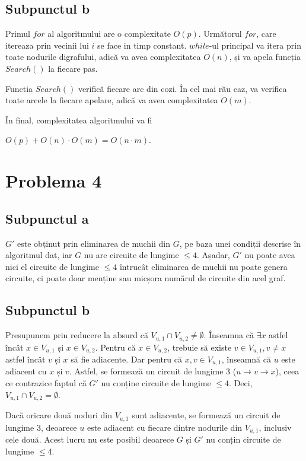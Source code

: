 \documentclass{article}
\begin{document}
\subsection*{\fontsize{16}{30}\selectfont Subpunctul b}
{\fontsize{14}{16}\selectfont
Primul $for$ al algoritmului are o complexitate $O(p)$. Următorul $for$, care itereaza prin vecinii lui $i$ se face in timp constant. $while$-ul principal va itera prin toate nodurile digrafului, adică va avea complexitatea $O(n)$, și va apela funcția $Search()$ la fiecare pas.

Functia $Search()$ verifică fiecare arc din cozi. În cel mai rău caz, va verifica toate arcele la fiecare apelare, adică va avea complexitatea $O(m)$.

În final, complexitatea algoritmului va fi \\
\centerline {$O(p) + O(n) \cdot O(m) = O(n \cdot m)$.}
}

\section*{\fontsize{20}{50}\selectfont Problema 4}

\subsection*{\fontsize{16}{30}\selectfont Subpunctul a}
{\fontsize{14}{16}\selectfont
\par $G'$ este obținut prin eliminarea de muchii din $G$, pe baza unei condiții descrise în algoritmul dat, iar $G$ nu are circuite de lungime $\le 4$. Așadar, $G'$ nu poate avea nici el circuite de lungime $\le 4$ întrucât eliminarea de muchii nu poate genera circuite, ci poate doar menține sau micșora numărul de circuite din acel graf.}

\subsection*{\fontsize{16}{30}\selectfont Subpunctul b}
{\fontsize{14}{16}\selectfont
\par Presupunem prin reducere la absurd că $V_{u,1} \cap V_{u,2} \neq \emptyset$. Înseamna că $\exists x$ astfel încât $x \in V_{u,1}$ și $x \in V_{u,2}$. Pentru că $x \in V_{u,2}$, trebuie să existe $v \in V_{u,1}, v \ne x$ astfel încât $v$ și $x$ să fie adiacente. Dar pentru că $x,v \in V_{u,1}$, înseamnă că $u$ este adiacent cu $x$ și $v$. Astfel, se formează un circuit de lungime 3 ($u \rightarrow v \rightarrow x$), ceea ce contrazice faptul că $G'$ nu conține circuite de lungime $\le 4$. Deci, $V_{u,1} \cap V_{u,2} = \emptyset$.}

{\fontsize{14}{16}\selectfont
\par Dacă oricare două noduri din $V_{u,1}$ sunt adiacente, se formează un circuit de lungime 3, deoarece $u$ este adiacent cu fiecare dintre nodurile din $V_{u,1}$, inclusiv cele două. Acest lucru nu este posibil deoarece $G$ și $G'$ nu conțin circuite de lungime $\le 4$.}
\end{document}
